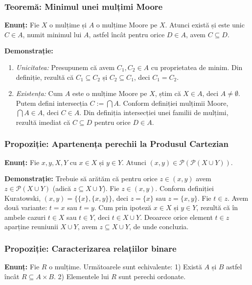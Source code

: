 \subsubsection{Teoremă: Minimul unei mulțimi Moore}
\textbf{Enunț:} Fie $X$ o mulțime și $A$ o mulțime Moore pe $X$. Atunci există și este unic $C \in A$, numit minimul lui $A$, astfel încât pentru orice $D \in A$, avem $C \subseteq D$.

\textbf{Demonstrație:}
\begin{enumerate}
	\item \textit{Unicitatea:} Presupunem că avem $C_1, C_2 \in A$ cu proprietatea de minim. Din definiție, rezultă că $C_1 \subseteq C_2$ și $C_2 \subseteq C_1$, deci $C_1 = C_2$.
	\item \textit{Existența:} Cum $A$ este o mulțime Moore pe $X$, știm că $X \in A$, deci $A \neq \emptyset$. Putem defini intersecția $C := \bigcap A$. Conform definiției mulțimii Moore, $\bigcap A \in A$, deci $C \in A$. Din definiția intersecției unei familii de mulțimi, rezultă imediat că $C \subseteq D$ pentru orice $D \in A$.
\end{enumerate}

\subsubsection{Propoziție: Apartenența perechii la Produsul Cartezian}
\textbf{Enunț:} Fie $x, y, X, Y$ cu $x \in X$ și $y \in Y$. Atunci $(x, y) \in \mathcal{P}(\mathcal{P}(X \cup Y))$.

\textbf{Demonstrație:}
Trebuie să arătăm că pentru orice $z \in (x,y)$ avem $z \in \mathcal{P}(X \cup Y)$ (adică $z \subseteq X \cup Y$).
Fie $z \in (x,y)$. Conform definiției Kuratowski, $(x,y) = \{\{x\}, \{x,y\}\}$, deci $z = \{x\}$ sau $z = \{x,y\}$.
Fie $t \in z$. Avem două variante: $t=x$ sau $t=y$. Cum prin ipoteză $x \in X$ și $y \in Y$, rezultă că în ambele cazuri $t \in X$ sau $t \in Y$, deci $t \in X \cup Y$.
Deoarece orice element $t \in z$ aparține reuniunii $X \cup Y$, avem $z \subseteq X \cup Y$, de unde concluzia.

\subsubsection{Propoziție: Caracterizarea relațiilor binare}
\textbf{Enunț:} Fie $R$ o mulțime. Următoarele sunt echivalente:
1) Există $A$ și $B$ astfel încât $R \subseteq A \times B$.
2) Elementele lui $R$ sunt perechi ordonate.

